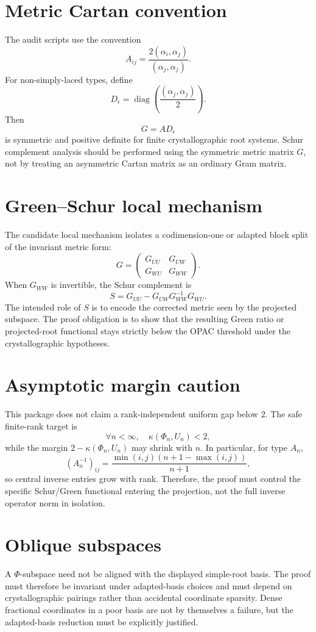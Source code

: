 \documentclass[11pt]{article}
\begin{document}
\section{Metric Cartan convention}
The audit scripts use the convention
\[
A_{ij}=\frac{2(\alpha_i,\alpha_j)}{(\alpha_j,\alpha_j)}.
\]
For non-simply-laced types, define
\[
D_\epsilon=\operatorname{diag}\left(\frac{(\alpha_j,\alpha_j)}{2}\right).
\]
Then
\[
G=A D_\epsilon
\]
is symmetric and positive definite for finite crystallographic root systems. Schur complement analysis should be performed using the symmetric metric matrix $G$, not by treating an asymmetric Cartan matrix as an ordinary Gram matrix.

\section{Green--Schur local mechanism}
The candidate local mechanism isolates a codimension-one or adapted block split of the invariant metric form:
\[
G=\begin{pmatrix}G_{UU}&G_{UW}\\G_{WU}&G_{WW}\end{pmatrix}.
\]
When $G_{WW}$ is invertible, the Schur complement is
\[
S=G_{UU}-G_{UW}G_{WW}^{-1}G_{WU}.
\]
The intended role of $S$ is to encode the corrected metric seen by the projected subspace. The proof obligation is to show that the resulting Green ratio or projected-root functional stays strictly below the OPAC threshold under the crystallographic hypotheses.

\section{Asymptotic margin caution}
This package does not claim a rank-independent uniform gap below $2$. The safe finite-rank target is
\[
\forall n<\infty,\quad \kappa(\Phi_n,U_n)<2,
\]
while the margin $2-\kappa(\Phi_n,U_n)$ may shrink with $n$. In particular, for type $A_n$,
\[
(A_n^{-1})_{ij}=\frac{\min(i,j)(n+1-\max(i,j))}{n+1},
\]
so central inverse entries grow with rank. Therefore, the proof must control the specific Schur/Green functional entering the projection, not the full inverse operator norm in isolation.

\section{Oblique subspaces}
A $\Phi$-subspace need not be aligned with the displayed simple-root basis. The proof must therefore be invariant under adapted-basis choices and must depend on crystallographic pairings rather than accidental coordinate sparsity. Dense fractional coordinates in a poor basis are not by themselves a failure, but the adapted-basis reduction must be explicitly justified.
\end{document}
